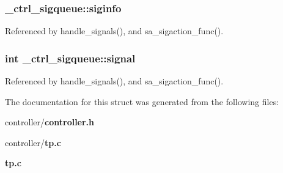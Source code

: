 \subsubsection[{siginfo}]{ {\bf \_\-ctrl\_\-sigqueue::siginfo}}\label{struct__ctrl__sigqueue_a9fdfd4fe7c65efd1731d67d7101e7fd5}


Referenced by handle\_\-signals(), and sa\_\-sigaction\_\-func().

\subsubsection[{signal}]{\setlength{\rightskip}{0pt plus 5cm}int {\bf \_\-ctrl\_\-sigqueue::signal}}\label{struct__ctrl__sigqueue_afd350497c82cb6ff89c729fec571a01f}


Referenced by handle\_\-signals(), and sa\_\-sigaction\_\-func().



The documentation for this struct was generated from the following files:\begin{DoxyCompactItemize}
\item 
controller/{\bf controller.h}\item 
controller/{\bf tp.c}\item 
{\bf tp.c}\end{DoxyCompactItemize}
